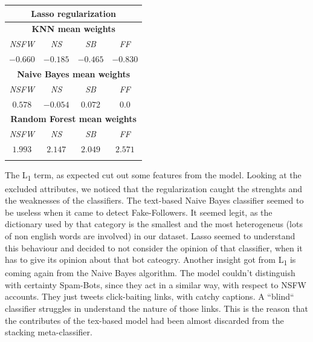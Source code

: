 \begin{center}
	\begin{tabular}{@{}cccc@{}}
		\multicolumn{4}{c}{Lasso regularization}\\
		\hline\hline
		\multicolumn{4}{c}{\textbf{KNN mean weights}}\\
		\hline
		\multicolumn{1}{c|}{\textit{NSFW}}&
		\multicolumn{1}{c|}{\textit{NS}}&
		\multicolumn{1}{c|}{\textit{SB}}&
		\multicolumn{1}{c}{\textit{FF}}\\
		\hline
		\multicolumn{1}{c|}{$ -0.660 $}&
		\multicolumn{1}{c|}{$ -0.185 $}&
		\multicolumn{1}{c|}{$ -0.465 $}&
		\multicolumn{1}{c}{$ -0.830 $}\\
		\hline
		\multicolumn{4}{c}{\textbf{Naive Bayes mean weights}}\\
		\hline
		\multicolumn{1}{c|}{\textit{NSFW}}&
		\multicolumn{1}{c|}{\textit{NS}}&
		\multicolumn{1}{c|}{\textit{SB}}&
		\multicolumn{1}{c}{\textit{FF}}\\
		\hline
		\multicolumn{1}{c|}{$ 0.578 $}&
		\multicolumn{1}{c|}{$ -0.054 $}&
		\multicolumn{1}{c|}{$ 0.072 $}&
		\multicolumn{1}{c}{$ 0.0 $}\\
		\hline
		\multicolumn{4}{c}{\textbf{Random Forest mean weights}}\\
		\hline
		\multicolumn{1}{c|}{\textit{NSFW}}&
		\multicolumn{1}{c|}{\textit{NS}}&
		\multicolumn{1}{c|}{\textit{SB}}&
		\multicolumn{1}{c}{\textit{FF}}\\
		\hline
		\multicolumn{1}{c|}{$ 1.993 $}&
		\multicolumn{1}{c|}{$ 2.147 $}&
		\multicolumn{1}{c|}{$ 2.049 $}&
		\multicolumn{1}{c}{$ 2.571 $}\\
		\hline\hline\\
	\end{tabular}
\end{center}
The L\textsubscript{1} term, as expected cut out some features from the model.
Looking at the excluded attributes, we noticed that the regularization caught the strenghts and the weaknesses of the classifiers. The text-based Naive Bayes classifier seemed to be useless when it came to detect Fake-Followers. It seemed legit, as the dictionary used by that category is the smallest and the most heterogeneus (lots of non english words are involved) in our dataset.
Lasso seemed to understand this behaviour and decided to not consider the opinion of that classifier, when it has to give its opinion about that bot cateogry.
Another insight got from L\textsubscript{1} is coming again from the Naive Bayes algorithm. The model couldn't distinguish with certainty Spam-Bots, since they act in a similar way, with respect to NSFW accounts. They just tweets click-baiting links, with catchy captions. A ``blind`` classifier struggles in understand the nature of those links. This is the reason that the contributes of the tex-based model had been almost discarded from the stacking meta-classifier.

